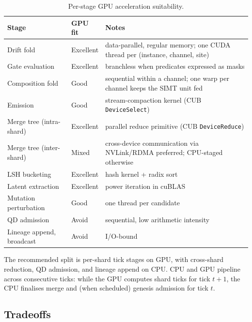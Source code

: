 \documentclass[journal,onecolumn,11pt]{IEEEtran}
\theoremstyle{definition}
\begin{document}
\begin{table}[ht]
\centering
\caption{Per-stage GPU acceleration suitability.}
\label{tab:sldm-gpu}
\small
\begin{tabularx}{\linewidth}{l l Y}
\toprule
Stage & GPU fit & Notes \\
\midrule
Drift fold                     & Excellent & data-parallel, regular memory; one CUDA thread per (instance, channel, site) \\
Gate evaluation                & Excellent & branchless when predicates expressed as masks \\
Composition fold               & Good      & sequential within a channel; one warp per channel keeps the SIMT unit fed \\
Emission                       & Good      & stream-compaction kernel (CUB \texttt{DeviceSelect}) \\
Merge tree (intra-shard)       & Excellent & parallel reduce primitive (CUB \texttt{DeviceReduce}) \\
Merge tree (inter-shard)       & Mixed     & cross-device communication via NVLink/RDMA preferred; CPU-staged otherwise \\
LSH bucketing                  & Excellent & hash kernel + radix sort \\
Latent extraction              & Excellent & power iteration in cuBLAS \\
Mutation perturbation          & Good      & one thread per candidate \\
QD admission                   & Avoid     & sequential, low arithmetic intensity \\
Lineage append, broadcast      & Avoid     & I/O-bound \\
\bottomrule
\end{tabularx}
\end{table}

The recommended split is per-shard tick stages on GPU, with cross-shard reduction, QD admission, and lineage append on CPU. CPU and GPU pipeline across consecutive ticks: while the GPU computes shard ticks for tick $t+1$, the CPU finalises merge and (when scheduled) genesis admission for tick $t$.

\subsection{Tradeoffs}
\end{document}

